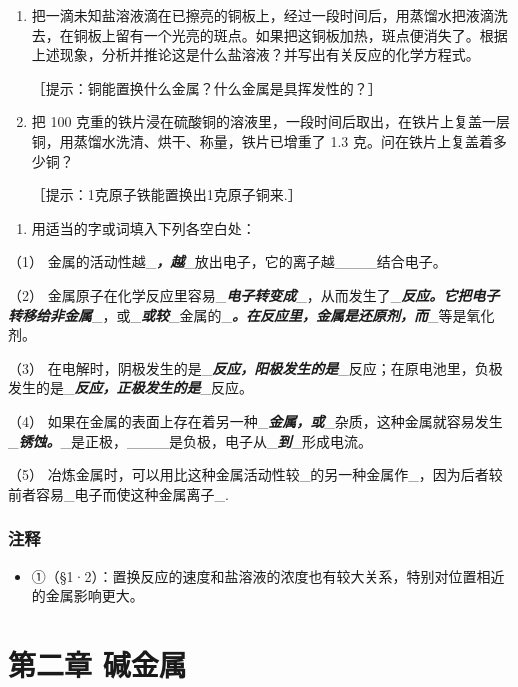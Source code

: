 \begin{enumerate}[start=5,label={*\arabic*.}]
\item
  把一滴未知盐溶液滴在已擦亮的铜板上，经过一段时间后，用蒸馏水把液滴洗去，在铜板上留有一个光亮的斑点。如果把这铜板加热，斑点便消失了。根据上述现象，分析并推论这是什么盐溶液？并写出有关反应的化学方程式。

［提示：铜能置换什么金属？什么金属是具挥发性的？］

\item
  把 100
克重的铁片浸在硫酸铜的溶液里，一段时间后取出，在铁片上复盖一层铜，用蒸馏水洗清、烘干、称量，铁片已增重了
1.3 克。问在铁片上复盖着多少铜？

［提示：1克原子铁能置换出1克原子铜来.］

\end{enumerate}
\begin{enumerate}[start=7]
\item
  用适当的字或词填入下列各空白处：
\end{enumerate}

（1）
金属的活动性越\_\textbf{\emph{，越}}\_放出电子，它的离子越\_\_\_\_结合电子。

（2）
金属原子在化学反应里容易\_\textbf{\emph{电子转变成}}\_，从而发生了\_\textbf{\emph{反应。它把电子转移给非金属}}\_，或\_\textbf{\emph{或较}}\_金属的\_\textbf{\emph{。在反应里，金属是还原剂，而}}\_等是氧化剂。

（3）
在电解时，阴极发生的是\_\textbf{\emph{反应，阳极发生的是}}\_反应；在原电池里，负极发生的是\_\textbf{\emph{反应，正极发生的是}}\_反应。

（4）
如果在金属的表面上存在着另一种\_\textbf{\emph{金属，或}}\_杂质，这种金属就容易发生\_\textbf{\emph{锈蚀。}}\_是正极，\_\_\_\_是负极，电子从\_\textbf{\emph{到}}\_形成电流。

（5）
冶炼金属时，可以用比这种金属活动性较\_的另一种金属作\_，因为后者较前者容易\_电子而使这种金属离子\_.

\subsection{注释}

\begin{itemize}
\item
  ①（§1·2）：置换反应的速度和盐溶液的浓度也有较大关系，特别对位置相近的金属影响更大。
\end{itemize}

\chapter{第二章 碱金属}


